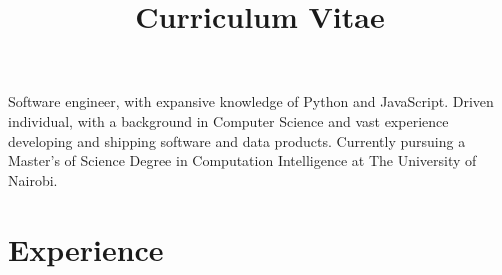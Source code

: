 \documentclass[11pt,a4paper,sans]{moderncv}        %
\title{Curriculum Vitae}                               %
\begin{document}
\makecvtitle

\small{Software engineer, with expansive knowledge of Python and JavaScript. Driven individual, with a background in Computer Science and vast experience developing and shipping software and data products. Currently pursuing a Master's of Science Degree in Computation Intelligence at The University of Nairobi.}

\section{Experience}

\vspace{6pt}
\end{document}
